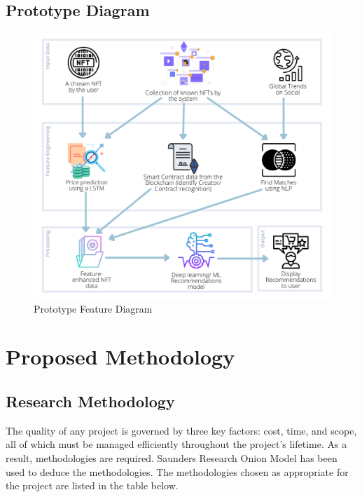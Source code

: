 \documentclass[a4paper, 12pt, oneside]{report}
\begin{document}
\section{Prototype Diagram}
\begin{figure}[ht!]
\centering
\includegraphics[width=\textwidth]{images/Protyotype Feature Diagram.png}
\caption{Prototype Feature Diagram}
\end{figure}



\chapter{Proposed Methodology}

\section{Research Methodology}
The quality of any project is governed by three key factors: cost, time, and scope, all of which must be managed efficiently throughout the project's lifetime. As a result, methodologies are required. Saunders  Research Onion Model \autocite{writers_saunders_2019} has been used to deduce the methodologies. 
The methodologies chosen as appropriate for the project are listed in the table below.
\end{document}
